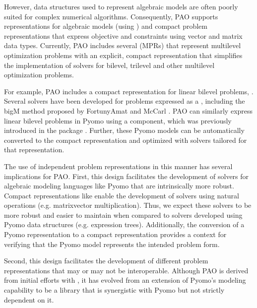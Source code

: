 \documentclass[letterpaper,10pt,english]{sphinxmanual}
\begin{document}
However, data structures used to represent algebraic models are often
poorly suited for complex numerical algorithms.  Consequently, PAO
supports  representations for algebraic models (using ) and compact problem representations
that express objective and constraints using vector and matrix data types.
Currently, PAO includes several 
(MPRs) that represent multilevel optimization problems with an explicit,
compact representation that simplifies the implementation of solvers
for bilevel, trilevel and other multilevel optimization problems.

For example, PAO includes a compact representation for linear bilevel
problems, .  Several solvers have been
developed for problems expressed as a ,
including the big\sphinxhyphen{}M method proposed by Fortuny\sphinxhyphen{}Amat and McCarl
.  PAO can similarly express linear bilevel problems in
Pyomo using a  component, which was previously introduced in
the  package .  Further, these Pyomo models
can be automatically converted to the compact 
representation and optimized with solvers tailored for that representation.

The use of independent problem representations in this manner has
several implications for PAO.  First, this design facilitates the
development of solvers for algebraic modeling languages like Pyomo
that are intrinsically more robust.  Compact representations like
 enable the development of solvers using
natural operations (e.g. matrix\sphinxhyphen{}vector multiplication).  Thus, we expect
these solvers to be more robust and easier to maintain when compared to
solvers developed using Pyomo data structures (e.g. expression trees).
Additionally, the conversion of a Pyomo representation to a compact
representation provides a context for verifying that the Pyomo model
represents the intended problem form.

Second, this design facilitates the development of different problem
representations that may or may not be inter\sphinxhyphen{}operable.  Although PAO
is derived from initial efforts with , it has evolved
from an extension of Pyomo’s modeling capability to be a library that
is synergistic with Pyomo but not strictly dependent on it.
\end{document}
